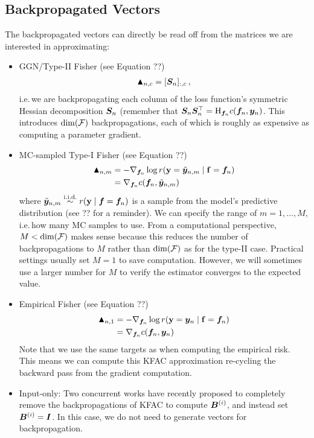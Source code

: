\subsection{Backpropagated Vectors}
The backpropagated vectors can directly be read off from the matrices we are interested in approximating:
\begin{itemize}
\item GGN/Type-II Fisher (see Equation ??)
  \begin{align*}
    \blacktriangle_{n,c} = [{\bm{S}}_n]_{:,c}\,,
  \end{align*}
  i.e.\,we are backpropagating each column of the loss function's symmetric Hessian decomposition ${\bm{S}}_n$ (remember that ${\bm{S}}_n {\bm{S}}_n^{\top} = \mathrm{H}_{{\bm{f}}_n} c({\bm{f}}_n, {\bm{y}}_n)$.
  This introduces $\dim({\mathcal{F}})$ backpropagations, each of which is roughly as expensive as computing a parameter gradient.

\item MC-sampled Type-I Fisher (see Equation ??)
  \begin{align*}
    \blacktriangle_{n,m}
    &= -\nabla_{{\bm{f}}_n} \log r({\mathbf{y}}=\tilde{{\bm{y}}}_{n,m} \mid {\mathbf{f}} = {\bm{f}}_n)
    \\
    &= \nabla_{{\bm{f}}_n}  c({\bm{f}}_n, \tilde{{\bm{y}}}_{n,m})
  \end{align*}
  where $\tilde{{\bm{y}}}_{n,m} \stackrel{\text{i.i.d.}}{\sim} r({\mathbf{y}} \mid {\bm{f}} = {\bm{f}}_n)$ is a sample from the model's predictive distribution (see ?? for a reminder).
  We can specify the range of $m=1, \dots, M$, i.e.\,how many MC samples to use.
  From a computational perspective, $M < \dim({\mathcal{F}})$ makes sense because this reduces the number of backpropagations to $M$ rather than $\dim({\mathcal{F}})$ as for the type-II case.
  Practical settings usually set $M=1$ to save computation.
  However, we will sometimes use a larger number for $M$ to verify the estimator converges to the expected value.

\item Empirical Fisher (see Equation ??)
  \begin{align*}
    \blacktriangle_{n,1}
    &= -\nabla_{{\bm{f}}_n} \log r({\mathbf{y}}={\bm{y}}_n \mid {\mathbf{f}} = {\bm{f}}_n)
    \\
    &= \nabla_{{\bm{f}}_n}  c({\bm{f}}_n, {\bm{y}}_n)
  \end{align*}
  Note that we use the same targets as when computing the empirical risk.
  This means we can compute this KFAC approximation re-cycling the backward pass from the gradient computation.

\item Input-only: Two concurrent works have recently proposed to completely remove the backpropagations of KFAC to compute ${\bm{B}}^{(i)}$, and instead set ${\bm{B}}^{(i)} = {\bm{I}}$.
  In this case, we do not need to generate vectors for backpropagation.

\end{itemize}

